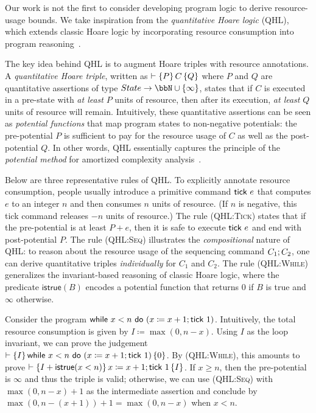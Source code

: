 Our work is not the first to consider developing program logic to derive resource-usage bounds.
%
We take inspiration from the \emph{quantitative Hoare logic} (QHL), which extends classic Hoare logic by incorporating resource consumption into program reasoning~\cite{PLDI:CHR14,PLDI:CHS15}.

The key idea behind QHL is to augment Hoare triples with resource annotations.
%
A \emph{quantitative Hoare triple}, written as $\vdash\left\{P\right\}C\left\{Q\right\}$ where $P$ and $Q$ are quantitative assertions of type $State \to \bbN \cup \{ \infty\}$, states that if $C$ is executed in a pre-state with \emph{at least} $P$ units of resource, then after its execution, \emph{at least} $Q$ units of resource will remain.
%
Intuitively, these quantitative assertions can be seen as \emph{potential functions} that map program states to non-negative potentials: the pre-potential $P$ is sufficient to pay for the resource usage of $C$ as well as the post-potential $Q$.
%
In other words, QHL essentially captures the principle of the \emph{potential method} for amortized complexity analysis~\cite{JADM:Tarjan85}.

Below are three representative rules of QHL.
%
To explicitly annotate resource consumption, people usually introduce a primitive command $\textsf{tick}~e$ that computes $e$ to an integer $n$ and then consumes $n$ units of resource.
(If $n$ is negative, this tick command releases $-n$ units of resource.)
%
The rule \textsc{(QHL:Tick)} states that if the pre-potential is at least $P + e$, then it is safe to execute $\textsf{tick}~e$ and end with post-potential $P$.
%
The rule \textsc{(QHL:Seq)} illustrates the \emph{compositional} nature of QHL: to reason about the resource usage of the sequencing command $C_1;C_2$, one can derive quantitative triples \emph{individually} for $C_1$ and $C_2$.
%
The rule \textsc{(QHL:While)} generalizes the invariant-based reasoning of classic Hoare logic, where the predicate $\mathsf{istrue}(B)$ encodes a potential function that returns $0$ if $B$ is true and $\infty$ otherwise.
%

Consider the program $\textsf{while}~x<n~\textsf{do}~(x\coloneqq x+1;\textsf{tick}~1)$.
%
Intuitively, the total resource consumption is given by $I \coloneqq \max(0, n - x)$.
%
Using $I$ as the loop invariant, we can prove the judgement $\vdash\left\{I\right\}\textsf{while}~x<n~\textsf{do}~(x\coloneqq x+1;\textsf{tick}~1)\left\{0\right\}$.
%
By \textsc{(QHL:While)}, this amounts to prove $\vdash\left\{I+\mathsf{istrue}(x<n)\right\}x\coloneqq x+1; \textsf{tick}~1\left\{I\right\}$.
%
If $x \ge n$, then the pre-potential is $\infty$ and thus the triple is valid;
otherwise, we can use \textsc{(QHL:Seq)} with $\max(0,n-x) + 1$ as the intermediate assertion and conclude by $\max(0,n-(x+1))+1 = \max(0,n-x)$ when $x<n$.

